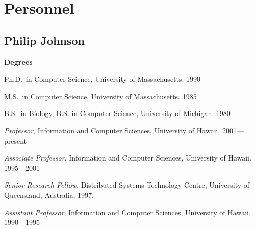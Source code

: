 

\newcommand{\newcategory}[1]{\newenvironment{#1}
 {\sectionheading{#1}\begin{list}{}{\setlength{\labelwidth}{0cm} \setlength{\labelsep}{0cm} \setlength{\itemsep}{0ex plus0.2ex} \setlength{\itemindent}{-1cm} \setlength{\leftmargin}{1cm} \setlength{\parsep}{0ex plus0.2ex}}}{\end{list}\par}}
\newcommand{\sectionheading}[1]{\medskip\pagebreak[2]\par\noindent
 {\small\bf #1}\nopagebreak}

\section{Personnel}

\subsection{Philip Johnson}

\newcategory{Degrees}
\begin{Degrees}
\item Ph.D.~in Computer Science, University of Massachusetts. 1990 
\item M.S.~in Computer Science, University of Massachusetts.  1985
\item B.S.~in Biology, B.S. in Computer Science, University of Michigan. 1980
\end{Degrees}

\newcategory{Academic Appointments}
\begin{Academic Appointments}
\item {\em Professor},  Information and Computer
  Sciences, University of Hawaii.  2001---present

\item {\em Associate Professor},  Information and Computer
  Sciences, University of Hawaii.  1995---2001

\item {\em Senior Research Fellow},  Distributed Systems Technology Centre,
University of Queensland, Australia, 1997.

\item {\em Assistant Professor},   Information and Computer
  Sciences, University of Hawaii.  1990---1995

\end{Academic Appointments}


